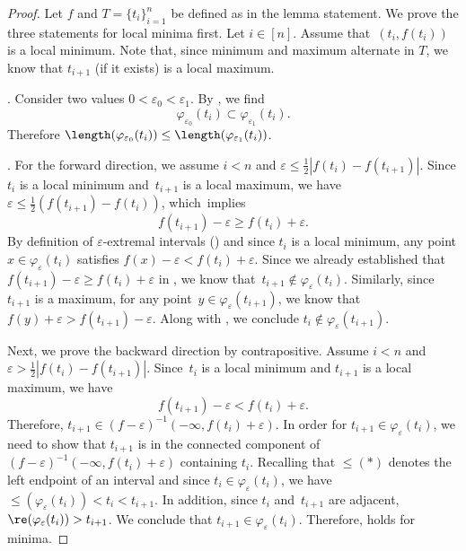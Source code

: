 \begin{proof}

    Let $f$ and $T=\{t_i\}_{i=1}^n$ be defined as in the lemma statement.
    We prove the three statements for local minima first.
    Let $i \in [n]$. Assume that~$(t_i, f(t_i))$ is a local
    minimum.  Note that, since minimum and maximum alternate in $T$,
    we know that $t_{i+1}$ (if it exists) is a local maximum.

    .
    Consider two values $0 < \varepsilon_0 < \varepsilon_1$. By , we find
    \[ \varphi_{\varepsilon_0}(t_i) \subset \varphi_{\varepsilon_1}(t_i).\]
    Therefore $\length(\varphi_{\varepsilon_0}(t_i)) \leq \length(\varphi_{\varepsilon_1}(t_i))$.

    .
    For the forward direction, we assume $i < n$ and $\varepsilon \leq \frac{1}{2}|f(t_i)-f(t_{i+1})|$.
    Since $t_i$ is a local minimum and~$t_{i+1}$ is a local maximum,
    we have~$\varepsilon \leq \frac{1}{2}(f(t_{i+1})-f(t_i))$, which~implies
        \begin{equation}\label{eqn:minmaxineq}
            f(t_{i+1})-\varepsilon \geq f(t_i)+\varepsilon.
        \end{equation}
    By definition of $\varepsilon$-extremal intervals
    () and since $t_i$ is a local minimum,
    any point $x \in
    \varphi_{\varepsilon}(t_i)$ satisfies $f(x)-\varepsilon <
    f(t_i)+\varepsilon$. Since we already established that
    $ f(t_{i+1})-\varepsilon \geq f(t_i)+\varepsilon$ in ,
    we know that~$t_{i+1} \notin \varphi_{\varepsilon}(t_i)$.
    Similarly, since $t_{i+1}$ is a maximum, for any point~$y \in \varphi_{\varepsilon}(t_{i+1})$,
    we know that~$f(y)+\varepsilon > f(t_{i+1})-\varepsilon$. Along with
    , we conclude $t_i \notin
    \varphi_{\varepsilon}(t_{i+1})$.

    Next, we prove the backward direction by contrapositive.
    Assume $i < n$ and  $\varepsilon >
    \frac{1}{2}|f(t_i)-f(t_{i+1})|$. Since~$t_i$ is a local minimum and
    $t_{i+1}$ is a local maximum, we have
    $$f(t_{i+1})-\varepsilon <
    f(t_i)+\varepsilon.$$
    Therefore, $t_{i+1} \in (f-\varepsilon)^{-1}(-\infty,
    f(t_i)+\varepsilon)$. In order for $t_{i+1} \in
    \varphi_{\varepsilon}(t_i)$, we need to show that $t_{i+1}$ is in
    the connected component of  $(f-\varepsilon)^{-1}(-\infty,
    f(t_{i})+\varepsilon)$ containing $t_i$.
    Recalling that $\le(*)$ denotes the left endpoint of an interval and since
    \mbox{$t_i \in \varphi_{\varepsilon}(t_i)$}, we have
    $\le(\varphi_{\varepsilon}(t_i))<t_i<t_{i+1}$. In addition, since $t_i$
    and~$t_{i+1}$ are adjacent,
    $\re(\varphi_{\varepsilon}(t_i))>t_{i+1}$. We conclude that $t_{i+1} \in
    \varphi_{\varepsilon}(t_i)$. Therefore,
     holds for minima.


\end{proof}
